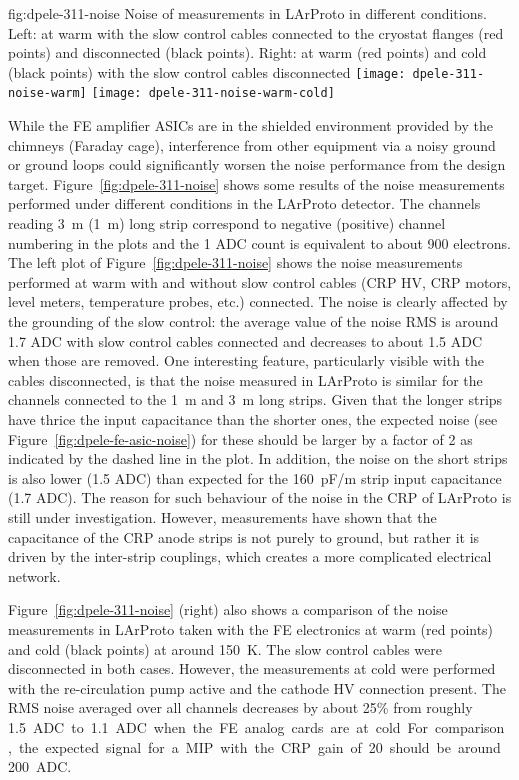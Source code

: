 \begin{dunefigure}{fig:dpele-311-noise}
{Noise of measurements in LArProto in different conditions. Left: at warm with the slow control cables connected to the cryostat flanges (red points) and disconnected (black points). Right: at warm (red points) and cold (black points) with the slow control cables disconnected}
\texttt{[image: dpele-311-noise-warm]}
\texttt{[image: dpele-311-noise-warm-cold]}
\end{dunefigure}

While the FE amplifier ASICs are in the shielded environment provided by the chimneys (Faraday cage), interference from other equipment via a noisy ground or ground loops could significantly worsen the noise performance from the design target. Figure~\ref{fig:dpele-311-noise} shows some results of the noise measurements performed under different conditions in the LArProto detector. The channels reading \SI{3}{\meter} (\SI{1}{\metre}) long strip correspond to negative (positive) channel numbering in the plots and the 1 ADC count is equivalent to about 900 electrons. The left plot of Figure~\ref{fig:dpele-311-noise} shows the noise measurements performed at warm with and without slow control cables (CRP HV, CRP motors, level meters, temperature probes, etc.) connected. The noise is clearly affected by the grounding of the slow control: the average value of the noise RMS is around \num{1.7} ADC with slow control cables connected and decreases to about \num{1.5} ADC when those are removed. One interesting feature, particularly visible with the cables disconnected, is that the noise measured in LArProto is similar for the channels connected to the \SI{1}{\meter} and \SI{3}{\meter} long strips. Given that the longer strips have thrice the input capacitance than the shorter ones, the expected noise (see Figure~\ref{fig:dpele-fe-asic-noise}) for these should be larger by a factor of \num{2} as indicated by the dashed line in the plot. In addition, the noise on the short strips is also lower (\num{1.5} ADC) than expected for the \SI{160}{pF/m} strip input capacitance (1.7 ADC). The reason for such behaviour of the noise in the CRP of LArProto is still under investigation. However, measurements have shown that the capacitance of the CRP anode strips is not purely to ground, but rather it is driven by the inter-strip couplings, which creates a more complicated electrical network. 

Figure~\ref{fig:dpele-311-noise} (right) also shows a comparison of the noise measurements in LArProto taken with the FE electronics at warm (red points) and cold (black points) at around \SI{150}{\kelvin}. The slow control cables were disconnected in both cases. However, the measurements at cold were performed with the re-circulation pump active and the cathode HV connection present. The RMS noise averaged over all channels decreases by about 25\% from roughly \SI{1.5} ADC to \SI{1.1} ADC when the FE analog cards are at cold. For comparison, the expected signal for a MIP with the CRP gain of 20 should be around \num{200} ADC. 


